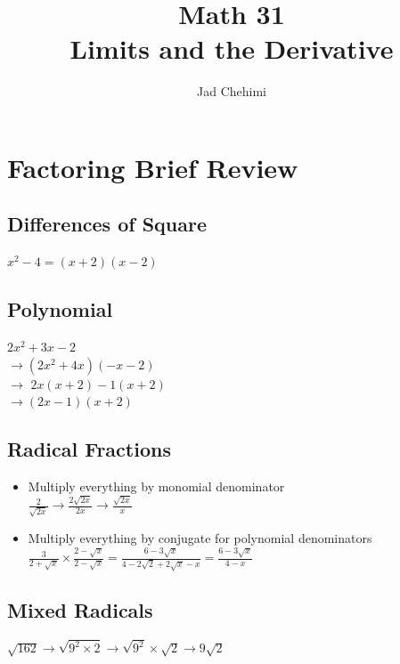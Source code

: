 \documentclass[a4paper,12pt]{article}
\title{Math 31 \\ Limits and the Derivative}
\author{Jad Chehimi}
\begin{document}
\maketitle

\tableofcontents

\pagebreak

\section{Factoring Brief Review}
\subsection{Differences of Square}
\Large
$x^2 - 4 = (x + 2)(x - 2)$
\normalsize

\subsection{Polynomial}
\Large
$2x^2 + 3x - 2$ \\
$\longrightarrow (2x^2 + 4x)(-x - 2)$ \\
$\longrightarrow \,\,2x(x+2) - 1(x+2)$ \\
$\longrightarrow (2x - 1)(x + 2)$
\normalsize

\subsection{Radical Fractions}
\begin{itemize}
    \item{
            Multiply everything by monomial denominator\\
            \Large
            $\frac{2}{\sqrt{2x}} \longrightarrow \frac{2\sqrt{2x}}{2x} \longrightarrow \frac{\sqrt{2x}}{x}$
            \normalsize
        }
    \item{
            Multiply everything by conjugate for polynomial denominators\\
            \Large
            $\frac{3}{2+\sqrt{x}} \times \frac{2-\sqrt{x}}{2-\sqrt{x}} = \frac{6-3\sqrt{x}}{4-2\sqrt{2} + 2\sqrt{x} - x} = \frac{6-3\sqrt{x}}{4-x}$
            \normalsize
        }
\end{itemize}

\subsection{Mixed Radicals}
\Large
$\sqrt{162} \longrightarrow \sqrt{9^2 \times 2} \longrightarrow \sqrt{9^2} \times \sqrt{2} \longrightarrow 9\sqrt{2}$
\normalsize
\end{document}
